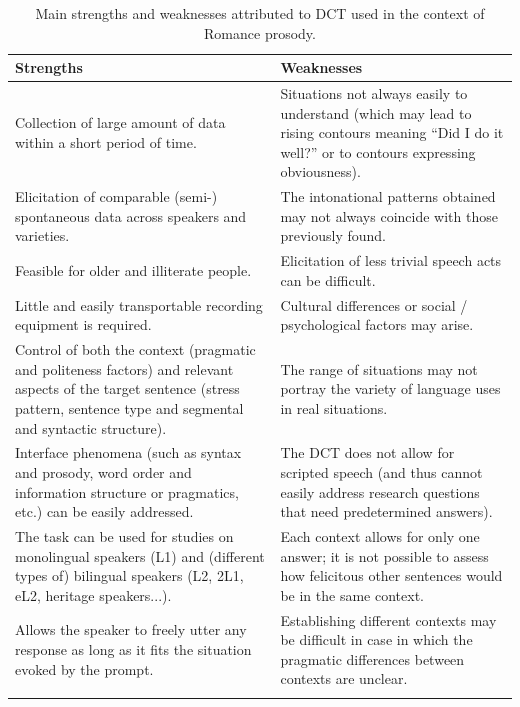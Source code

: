 \documentclass[output=paper]{LSP/langsci}
\begin{document}
\begin{table}
\begin{tabularx}{\textwidth}{XX}
\lsptoprule
 \bfseries Strengths & \bfseries Weaknesses\\
 \midrule
Collection of large amount of data within a short period of time. & Situations not always easily to understand (which may lead to rising contours meaning “Did I do it well?” or to contours expressing obviousness).\\
\tablevspace
Elicitation of comparable (semi-) spontaneous data across speakers and varieties. & The intonational patterns obtained may not always coincide with those previously found.\\
\tablevspace
Feasible for older and illiterate people. & Elicitation of less trivial speech acts can be difficult.\\
\tablevspace
Little and easily transportable recording equipment is required. & Cultural differences or social / psychological factors may arise.\\
\tablevspace
Control of both the context (pragmatic and politeness factors) and relevant aspects of the target sentence (stress pattern, sentence type and segmental and syntactic structure). & The range of situations may not portray the variety of language uses in real situations.\\
\tablevspace
Interface phenomena (such as syntax and prosody, word order and information structure or pragmatics, etc.) can be easily addressed. & The DCT does not allow for scripted speech (and thus cannot easily address research questions that need predetermined answers).\\
\tablevspace
The task can be used for studies on monolingual speakers (L1) and (different types of) bilingual speakers (L2, 2L1, eL2, heritage speakers...). & Each context allows for only one answer; it is not possible to assess how felicitous other sentences would be in the same context.\\
\tablevspace
Allows the speaker to freely utter any response as long as it fits the situation evoked by the prompt. & Establishing different contexts may be difficult in case in which the pragmatic differences between contexts are unclear.\\
\lspbottomrule
\end{tabularx}
\caption{\label{tab:van:1} Main strengths and weaknesses attributed to DCT used in the context of Romance prosody.}
\end{table}
\end{document}

